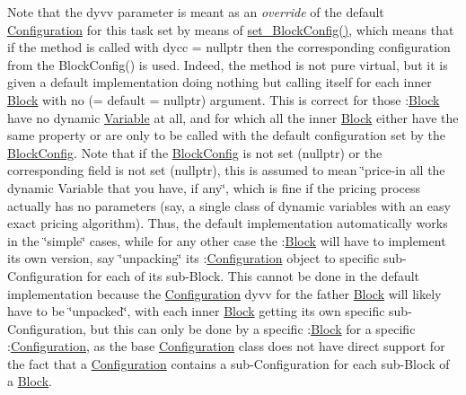 Note that the dyvv parameter is meant as an {\itshape override} of the default \mbox{\hyperlink{class_s_m_spp__di__unipi__it_1_1_configuration}{Configuration}} for this task set by means of \mbox{\hyperlink{class_s_m_spp__di__unipi__it_1_1_block_a18d411b740a47db00d15083c5c7ef2ba}{set\+\_\+\+Block\+Config()}}, which means that if the method is called with dycc = nullptr then the corresponding configuration from the Block\+Config() is used. Indeed, the method is not pure virtual, but it is given a default implementation doing nothing but calling itself for each inner \mbox{\hyperlink{class_s_m_spp__di__unipi__it_1_1_block}{Block}} with no (= default = nullptr) argument. This is correct for those \+:\mbox{\hyperlink{class_s_m_spp__di__unipi__it_1_1_block}{Block}} have no dynamic \mbox{\hyperlink{class_s_m_spp__di__unipi__it_1_1_variable}{Variable}} at all, and for which all the inner \mbox{\hyperlink{class_s_m_spp__di__unipi__it_1_1_block}{Block}} either have the same property or are only to be called with the default configuration set by the \mbox{\hyperlink{class_s_m_spp__di__unipi__it_1_1_block_config}{Block\+Config}}. Note that if the \mbox{\hyperlink{class_s_m_spp__di__unipi__it_1_1_block_config}{Block\+Config}} is not set (nullptr) or the corresponding field is not set (nullptr), this is assumed to mean \char`\"{}price-\/in all the dynamic Variable that you have, if
any\char`\"{}, which is fine if the pricing process actually has no parameters (say, a single class of dynamic variables with an easy exact pricing algorithm). Thus, the default implementation automatically works in the \char`\"{}simple\char`\"{} cases, while for any other case the \+:\mbox{\hyperlink{class_s_m_spp__di__unipi__it_1_1_block}{Block}} will have to implement its own version, say \char`\"{}unpacking\char`\"{} its \+:\mbox{\hyperlink{class_s_m_spp__di__unipi__it_1_1_configuration}{Configuration}} object to specific sub-\/\+Configuration for each of its sub-\/\+Block. This cannot be done in the default implementation because the \mbox{\hyperlink{class_s_m_spp__di__unipi__it_1_1_configuration}{Configuration}} dyvv for the father \mbox{\hyperlink{class_s_m_spp__di__unipi__it_1_1_block}{Block}} will likely have to be \char`\"{}unpacked\char`\"{}, with each inner \mbox{\hyperlink{class_s_m_spp__di__unipi__it_1_1_block}{Block}} getting its own specific sub-\/\+Configuration, but this can only be done by a specific \+:\mbox{\hyperlink{class_s_m_spp__di__unipi__it_1_1_block}{Block}} for a specific \+:\mbox{\hyperlink{class_s_m_spp__di__unipi__it_1_1_configuration}{Configuration}}, as the base \mbox{\hyperlink{class_s_m_spp__di__unipi__it_1_1_configuration}{Configuration}} class does not have direct support for the fact that a \mbox{\hyperlink{class_s_m_spp__di__unipi__it_1_1_configuration}{Configuration}} contains a sub-\/\+Configuration for each sub-\/\+Block of a \mbox{\hyperlink{class_s_m_spp__di__unipi__it_1_1_block}{Block}}. \mbox{\label{class_s_m_spp__di__unipi__it_1_1_block_ae14038d64cf6067f15cf3f53fd7af9e0}} 
